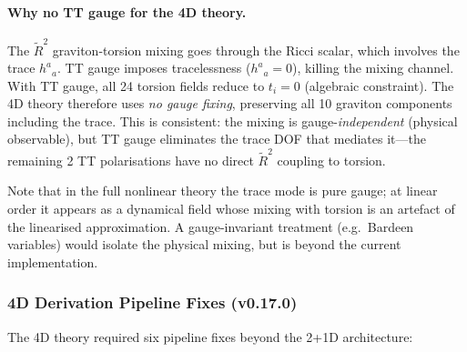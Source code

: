 \paragraph{Why no TT gauge for the 4D theory.}
The $\tilde{R}^2$ graviton-torsion mixing goes through the Ricci scalar, which involves the trace $h^a{}_a$.  TT gauge imposes tracelessness ($h^a{}_a = 0$), killing the mixing channel.  With TT gauge, all 24 torsion fields reduce to $t_i = 0$ (algebraic constraint).  The 4D theory therefore uses \emph{no gauge fixing}, preserving all 10 graviton components including the trace.  This is consistent: the mixing is gauge-\emph{independent} (physical observable), but TT gauge eliminates the trace DOF that mediates it---the remaining 2 TT polarisations have no direct $\tilde{R}^2$ coupling to torsion.

Note that in the full nonlinear theory the trace mode is pure gauge; at linear order it appears as a dynamical field whose mixing with torsion is an artefact of the linearised approximation.  A gauge-invariant treatment (e.g.\ Bardeen variables) would isolate the physical mixing, but is beyond the current implementation.

\subsubsection{4D Derivation Pipeline Fixes (v0.17.0)}

The 4D theory required six pipeline fixes beyond the 2+1D architecture:

